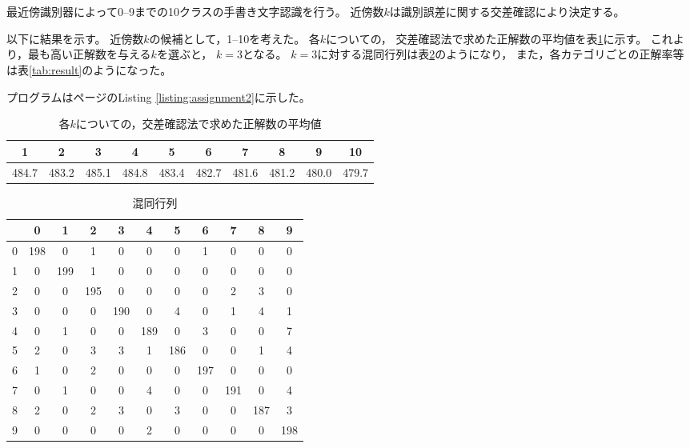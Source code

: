 \documentclass[class=jsarticle, crop=false, dvipdfmx, fleqn]{standalone}
\begin{document}
\section{}

最近傍識別器によって0--9までの10クラスの手書き文字認識を行う。
近傍数\(k\)は識別誤差に関する交差確認により決定する。

以下に結果を示す。
近傍数\(k\)の候補として，1--10を考えた。
各\(k\)についての，
交差確認法で求めた正解数の平均値を表\ref{tab:k_result}に示す。
これより，最も高い正解数を与える\(k\)を選ぶと，
\(k = 3\)となる。
\(k = 3\)に対する混同行列は表\ref{tab:confusion_matrix}のようになり，
また，各カテゴリごとの正解率等は表\ref{tab:result}のようになった。

プログラムは\pageref{listing:assignment2}ページのListing \ref{listing:assignment2}に示した。


\begin{table}[H]
	\centering
	\caption{各\(k\)についての，交差確認法で求めた正解数の平均値}
	\begin{tabular}{cccccccccc}
		1 & 2 & 3 & 4 & 5 & 6 & 7 & 8 & 9 & 10 \\ \hline
		484.7 & 483.2 & 485.1 & 484.8 & 483.4 & 482.7 & 481.6 & 481.2 & 480.0 & 479.7
	\end{tabular}
	\label{tab:k_result}
\end{table}

\begin{table}[H]
	\centering
	\caption{混同行列}
	\begin{tabular}{|c||cccccccccc|} \hline
			& 0 & 1 & 2 & 3 & 4 & 5 & 6 & 7 & 8 & 9 \\ \hline\hline
		0     & 198 & 0 & 1 & 0 & 0 & 0 & 1 & 0 & 0 & 0 \\
		1     & 0 & 199 & 1 & 0 & 0 & 0 & 0 & 0 & 0 & 0 \\
		2     & 0 & 0 & 195 & 0 & 0 & 0 & 0 & 2 & 3 & 0 \\
		3     & 0 & 0 & 0 & 190 & 0 & 4 & 0 & 1 & 4 & 1 \\
		4     & 0 & 1 & 0 & 0 & 189 & 0 & 3 & 0 & 0 & 7 \\
		5     & 2 & 0 & 3 & 3 & 1 & 186 & 0 & 0 & 1 & 4 \\
		6     & 1 & 0 & 2 & 0 & 0 & 0 & 197 & 0 & 0 & 0 \\
		7     & 0 & 1 & 0 & 0 & 4 & 0 & 0 & 191 & 0 & 4 \\
		8     & 2 & 0 & 2 & 3 & 0 & 3 & 0 & 0 & 187 & 3 \\
		9     & 0 & 0 & 0 & 0 & 2 & 0 & 0 & 0 & 0 & 198 \\
		\hline
	\end{tabular}
	\label{tab:confusion_matrix}
\end{table}
\end{document}
